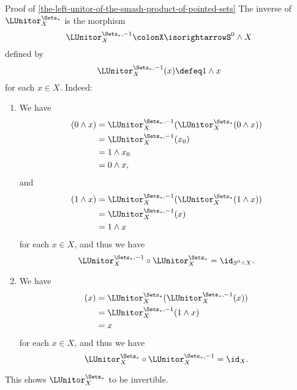 \begin{Proof}{Proof of \cref{the-left-unitor-of-the-smash-product-of-pointed-sets}}
    The inverse of $\LUnitor^{\Sets_{*}}_{X}$ is the morphism
    \[
        \LUnitor^{\Sets_{*},-1}_{X}%
        \colon%
        X%
        \isorightarrow%
        S^{0}\wedge X%
    \]%
    defined by
    \[
        \LUnitor^{\Sets_{*},-1}_{X}(x)%
        \defeq%
        1\wedge x
    \]%
    for each $x\in X$. Indeed:
    \begin{enumerate}
        \item\label{proof-of-the-left-unitor-of-the-smash-product-of-pointed-sets-3}We have
            \begin{align*}
                [\LUnitor^{\Sets_{*},-1}_{X}\circ\LUnitor^{\Sets_{*}}_{X}](0\wedge x) &= \LUnitor^{\Sets_{*},-1}_{X}(\LUnitor^{\Sets_{*}}_{X}(0\wedge x))\\
                                                                                      &= \LUnitor^{\Sets_{*},-1}_{X}(x_{0})\\
                                                                                      &= 1\wedge x_{0}\\
                                                                                      &= 0\wedge x,
            \end{align*}
            and 
            \begin{align*}
                [\LUnitor^{\Sets_{*},-1}_{X}\circ\LUnitor^{\Sets_{*}}_{X}](1\wedge x) &= \LUnitor^{\Sets_{*},-1}_{X}(\LUnitor^{\Sets_{*}}_{X}(1\wedge x))\\
                                                                                      &= \LUnitor^{\Sets_{*},-1}_{X}(x)\\
                                                                                      &= 1\wedge x
            \end{align*}
            for each $x\in X$, and thus we have
            \[
                \LUnitor^{\Sets_{*},-1}_{X}%
                \circ%
                \LUnitor^{\Sets_{*}}_{X}%
                =%
                \id_{S^{0}\wedge X}.%
            \]%
        \item\label{proof-of-the-left-unitor-of-the-smash-product-of-pointed-sets-4}We have
            \begin{align*}
                [\LUnitor^{\Sets_{*}}_{X}\circ\LUnitor^{\Sets_{*},-1}_{X}](x) &= \LUnitor^{\Sets_{*}}_{X}(\LUnitor^{\Sets_{*},-1}_{X}(x))\\
                                                                              &= \LUnitor^{\Sets_{*},-1}_{X}(1\wedge x)\\
                                                                              &= x
            \end{align*}
            for each $x\in X$, and thus we have
            \[
                \LUnitor^{\Sets_{*}}_{X}%
                \circ%
                \LUnitor^{\Sets_{*},-1}_{X}%
                =%
                \id_{X}.%
            \]%
    \end{enumerate}
    This shows $\LUnitor^{\Sets_{*}}_{X}$ to be invertible.


\end{Proof}
